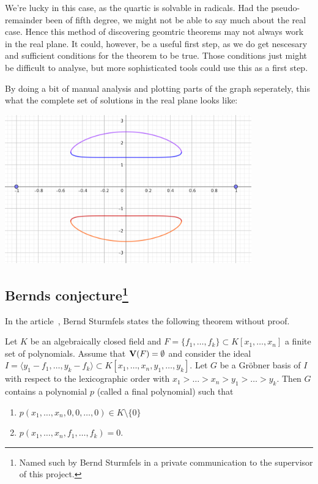 \begin{example}
  We're lucky in this case, as the quartic is solvable in radicals. Had the pseudo-remainder been of fifth degree, we might not be able to say much about the real case. Hence this method of discovering geomtric theorems may not always work in the real plane. It could, however, be a useful first step, as we do get nescesary and sufficient conditions for the theorem to be true. Those conditions just might be difficult to analyse, but more sophisticated tools could use this as a first step.

  By doing a bit of manual analysis and plotting parts of the graph seperately, this what the complete set of solutions in the real plane looks like:

  \begin{center}
    \includegraphics[width=0.8\textwidth]{geogebra_orthic_wow.png}
  \end{center}

\end{example}













\subsection[Bernds conjecture]{Bernds conjecture\footnote{Named such by Bernd Sturmfels in a private communication to the supervisor of this project.}}\label{sec:bernd}
In the article~\cite{sturmfels}, Bernd Sturmfels states the following theorem without proof.

\begin{theorem}
  Let $K$ be an algebraically closed field and $F = \{f_{1}, \dots, f_{k}\} \subset K[x_{1}, \dots, x_{n}]$ a finite set of polynomials. Assume that $\operatorname{\mathbf V}(F) = \emptyset$ and consider the ideal $I = \langle y_{1} - f_{1}, \dots, y_{k} - f_{k} \rangle \subset K[x_{1}, \dots, x_{n}, y_{1}, \dots, y_{k}]$. Let $G$ be a Gröbner basis of $I$ with respect to the lexicographic order with $x_{1} > \dots > x_{n} > y_{1} > \dots > y_{k}$. Then $G$ contains a polynomial $p$ (called a final polynomial) such that
  \begin{enumerate}
    \item $p(x_{1}, \dots, x_{n}, 0, 0, \dots, 0) \in K \setminus \{0\}$
    \item $p(x_{1}, \dots, x_{n}, f_{1}, \dots, f_{k}) = 0$.
  \end{enumerate}
\end{theorem}

